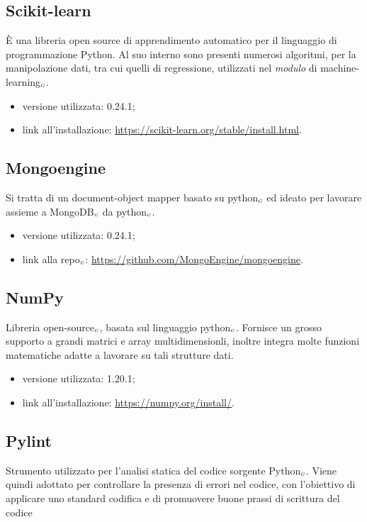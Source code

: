 \subsection{Scikit-learn}\label{LibrerieScikitLearn}
È una libreria open source di apprendimento automatico per il linguaggio di programmazione Python.
Al suo interno sono presenti numerosi algoritmi, per la manipolazione dati, tra cui quelli di regressione, utilizzati nel \textit{modulo} di machine-learning$_{\scaleto{G}{3pt}}$.

\begin{itemize}
  \item versione utilizzata: 0.24.1;
  \item link all'installazione: \url{https://scikit-learn.org/stable/install.html}.
\end{itemize}

\subsection{Mongoengine}\label{LibrerieMongoengine}
Si tratta di un document-object mapper basato su python$_{\scaleto{G}{3pt}}$ ed ideato per lavorare assieme a MongoDB$_{\scaleto{G}{3pt}}$ da python$_{\scaleto{G}{3pt}}$.

\begin{itemize}
  \item versione utilizzata: 0.24.1;
  \item link alla repo$_{\scaleto{G}{3pt}}$: \url{https://github.com/MongoEngine/mongoengine}.
\end{itemize}

\subsection{NumPy}\label{LibrerieNumpy}
Libreria open-source$_{\scaleto{G}{3pt}}$, basata sul linguaggio python$_{\scaleto{G}{3pt}}$.
Fornisce un grosso supporto a grandi matrici e array multidimensionli, inoltre integra molte funzioni matematiche adatte a lavorare su tali strutture dati.

\begin{itemize}
  \item versione utilizzata: 1.20.1;
  \item link all'installazione: \url{https://numpy.org/install/}.
\end{itemize}

\subsection{Pylint}\label{LibreriePylint}
Strumento utilizzato per l’analisi statica del codice sorgente Python$_{\scaleto{G}{3pt}}$. Viene quindi adottato per controllare la presenza di errori nel codice, con l’obiettivo di applicare uno standard codifica e di promuovere buone prassi di scrittura del codice

